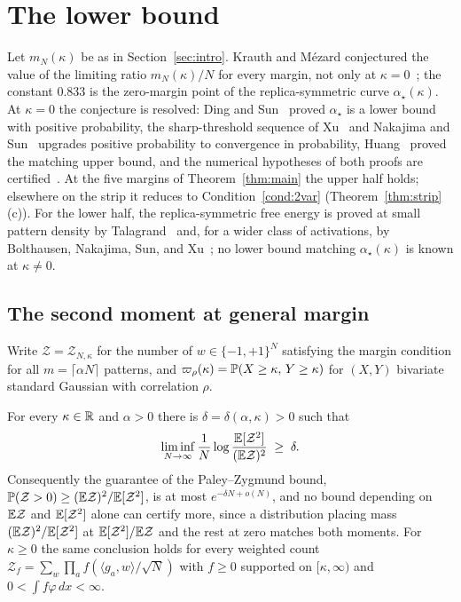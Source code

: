 \section{The lower bound}\label{sec:lower}

Let $m_N(\kappa)$ be as in Section~\ref{sec:intro}.  Krauth and M\'ezard conjectured the value of the
limiting ratio $m_N(\kappa)/N$ for every margin, not only at
$\kappa=0$~\cite{krauth1989storage}; the constant $0.833$ is the
zero-margin point of the replica-symmetric curve $\alpha_\star(\kappa)$.
At $\kappa=0$ the conjecture is resolved: Ding and
Sun~\cite{ding2019capacity} proved $\alpha_\star$ is a lower bound
with positive probability, the sharp-threshold sequence of Xu~\cite{xu2021} and Nakajima
and Sun~\cite{nakajimasun2022} upgrades positive probability to
convergence in probability, Huang~\cite{huang2024capacity} proved the
matching upper bound, and the numerical hypotheses of both proofs are
certified~\cite{shmalo2026capacity}.  At the five margins of
Theorem~\ref{thm:main} the upper half holds; elsewhere on the strip it
reduces to Condition~\ref{cond:2var} (Theorem~\ref{thm:strip}(c)).  For the lower half, the
replica-symmetric free energy is proved at small pattern density
by Talagrand~\cite{talagrand2000} and, for a wider class of
activations, by Bolthausen, Nakajima, Sun, and Xu~\cite{bnsx2022};
no lower bound matching $\alpha_\star(\kappa)$ is known at
$\kappa\ne0$.

\subsection{The second moment at general margin}

Write $\mathcal Z=\mathcal Z_{N,\kappa}$ for the number of $w\in\{-1,+1\}^N$ satisfying
the margin condition for all $m=\lceil\alpha N\rceil$ patterns, and
$\varpi_\rho(\kappa)=\mathbb{P}(X\ge\kappa,\,Y\ge\kappa)$ for $(X,Y)$ bivariate
standard Gaussian with correlation $\rho$.

\begin{lemma}\label{lem:secondmoment}
For every $\kappa\in\mathbb{R}$ and $\alpha>0$ there is
$\delta=\delta(\alpha,\kappa)>0$ such that
\[
\liminf_{N\to\infty}\frac1N\log\frac{\mathbb{E}[\mathcal Z^2]}{(\mathbb{E} \mathcal Z)^2}
\;\ge\; \delta .
\]
Consequently the guarantee of the Paley--Zygmund bound,
$\mathbb{P}(\mathcal Z>0)\ge(\mathbb{E} \mathcal Z)^2/\mathbb{E}[\mathcal Z^2]$, is at most $e^{-\delta N+o(N)}$, and no
bound depending on $\mathbb{E} \mathcal Z$ and
$\mathbb{E}[\mathcal Z^2]$ alone can certify more, since a distribution placing mass
$(\mathbb{E} \mathcal Z)^2/\mathbb{E}[\mathcal Z^2]$ at $\mathbb{E}[\mathcal Z^2]/\mathbb{E} \mathcal Z$ and the rest at zero matches
both moments.  For $\kappa\ge0$ the same conclusion holds for every
weighted count $\mathcal Z_f=\sum_w\prod_a f(\langle g_a,w\rangle/\sqrt N)$
with $f\ge0$ supported on $[\kappa,\infty)$ and
$0<\int f\varphi\,dx<\infty$.
\end{lemma}

